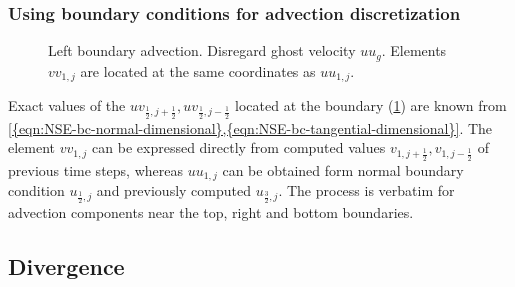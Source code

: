 \documentclass{article}
\numberwithin{equation}{section}
\begin{document}
\subsubsection{Using boundary conditions for advection discretization}\label{subsubsec:advection-near-boundary}
\begin{figure}[H] %
  \caption{Left boundary advection. Disregard ghost velocity $uu_g$. Elements $vv_{1,j}$ are located at the same coordinates as $uu_{1,j}$.}\label{fig:ADV-left}
\end{figure}
Exact values of the $uv_{\frac{1}{2},j+\frac{1}{2}},uv_{\frac{1}{2},j-\frac{1}{2}}$ located at the boundary  (\cref{fig:ADV-left}) are known from \cref{{eqn:NSE-bc-normal-dimensional},{eqn:NSE-bc-tangential-dimensional}}. The element $vv_{1,j}$ can be expressed directly from computed values $v_{1,j+\frac{1}{2}},v_{1,j-\frac{1}{2}}$ of previous time steps, whereas $uu_{1,j}$ can be obtained form normal boundary condition $u_{\frac{1}{2},j}$ and previously computed $u_{\frac{3}{2},j}$. The process is verbatim for advection components near the top, right and bottom boundaries.


\subsection{Divergence}\label{subsec:divergence}
\end{document}
